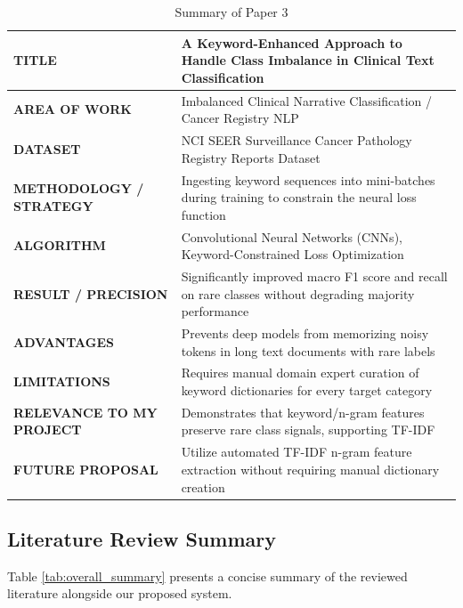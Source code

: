 \begin{table}[H]
\centering
\small
\setlength{\tabcolsep}{5pt}
\begin{tabularx}{\linewidth}{|>{\raggedright\arraybackslash}p{3.8cm}|>{\raggedright\arraybackslash}X|}
\hline
\textbf{TITLE} & A Keyword-Enhanced Approach to Handle Class Imbalance in Clinical Text Classification \cite{blanchard2022} \\
\hline
\textbf{AREA OF WORK} & Imbalanced Clinical Narrative Classification / Cancer Registry NLP \\
\hline
\textbf{DATASET} & NCI SEER Surveillance Cancer Pathology Registry Reports Dataset \\
\hline
\textbf{METHODOLOGY / STRATEGY} & Ingesting keyword sequences into mini-batches during training to constrain the neural loss function \\
\hline
\textbf{ALGORITHM} & Convolutional Neural Networks (CNNs), Keyword-Constrained Loss Optimization \\
\hline
\textbf{RESULT / PRECISION} & Significantly improved macro F1 score and recall on rare classes without degrading majority performance \\
\hline
\textbf{ADVANTAGES} & Prevents deep models from memorizing noisy tokens in long text documents with rare labels \\
\hline
\textbf{LIMITATIONS} & Requires manual domain expert curation of keyword dictionaries for every target category \\
\hline
\textbf{RELEVANCE TO MY PROJECT} & Demonstrates that keyword/n-gram features preserve rare class signals, supporting TF-IDF \\
\hline
\textbf{FUTURE PROPOSAL} & Utilize automated TF-IDF n-gram feature extraction without requiring manual dictionary creation \\
\hline
\end{tabularx}
\caption{Summary of Paper 3}
\label{tab:summary_paper3}
\end{table}

\subsection{Literature Review Summary}
Table \ref{tab:overall_summary} presents a concise summary of the reviewed literature alongside our proposed system.

